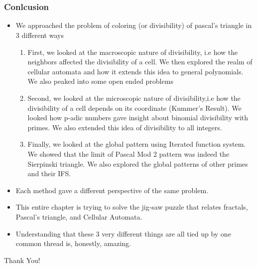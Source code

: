 \documentclass{beamer}
\begin{document}
\section*{}
\begin{frame}
    \frametitle{Conlcusion}
    \begin{itemize}
        \item We approached the problem of coloring (or divisibility) of pascal's triangle in 3 different ways 
        \begin{enumerate}
            \item First, we looked at the macroscopic nature of divisibility, i.e how the neighbors affected the divisibility of a cell. We then explored the realm of cellular automata and how it extends this idea to general polynomials. We also peaked into some open ended problems
            \item Second, we looked at the microscopic nature of divisibility,i.e how the divisibility of a cell depends on its coordinate (Kummer's Result). We looked how p-adic numbers gave insight about binomial divisibility with primes. We also extended this idea of divisibility to all integers.
            \item Finally, we looked at the global pattern using Iterated function system. We showed that the limit of Pascal Mod 2 pattern was indeed the Sierpinski triangle. We also explored the global patterns of other primes and their IFS. 
        \end{enumerate}
    \end{itemize}
\end{frame}

\begin{frame}
    \begin{itemize}
        \item Each method gave a different perspective of the same problem.
        \item This entire chapter is trying to solve the jig-saw puzzle that relates fractals, Pascal's triangle, and Cellular Automata. 
        \item Understanding that these 3 very different things are all tied up by one common thread is, honestly, amazing.
    \end{itemize}
\end{frame}

\begin{frame}
    \centering 
    \Huge{Thank You!}
\end{frame}

\end{document}
